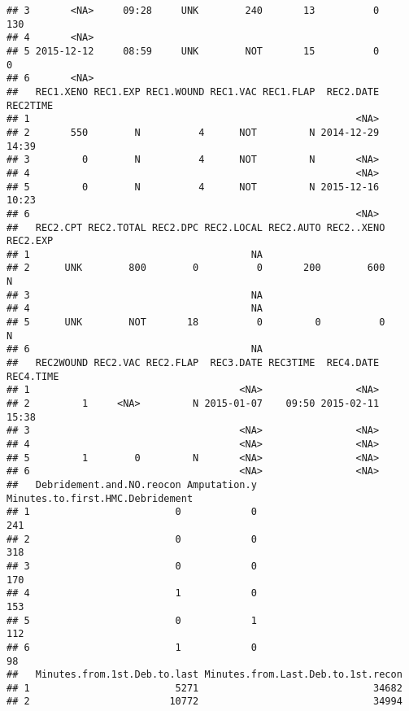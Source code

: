 \documentclass[]{article}
\begin{document}
\begin{verbatim}
## 3       <NA>     09:28     UNK        240       13          0       130
## 4       <NA>                                                           
## 5 2015-12-12     08:59     UNK        NOT       15          0         0
## 6       <NA>                                                           
##   REC1.XENO REC1.EXP REC1.WOUND REC1.VAC REC1.FLAP  REC2.DATE REC2TIME
## 1                                                        <NA>         
## 2       550        N          4      NOT         N 2014-12-29    14:39
## 3         0        N          4      NOT         N       <NA>         
## 4                                                        <NA>         
## 5         0        N          4      NOT         N 2015-12-16    10:23
## 6                                                        <NA>         
##   REC2.CPT REC2.TOTAL REC2.DPC REC2.LOCAL REC2.AUTO REC2..XENO REC2.EXP
## 1                                      NA                              
## 2      UNK        800        0          0       200        600        N
## 3                                      NA                              
## 4                                      NA                              
## 5      UNK        NOT       18          0         0          0        N
## 6                                      NA                              
##   REC2WOUND REC2.VAC REC2.FLAP  REC3.DATE REC3TIME  REC4.DATE REC4.TIME
## 1                                    <NA>                <NA>          
## 2         1     <NA>         N 2015-01-07    09:50 2015-02-11     15:38
## 3                                    <NA>                <NA>          
## 4                                    <NA>                <NA>          
## 5         1        0         N       <NA>                <NA>          
## 6                                    <NA>                <NA>          
##   Debridement.and.NO.reocon Amputation.y Minutes.to.first.HMC.Debridement
## 1                         0            0                              241
## 2                         0            0                              318
## 3                         0            0                              170
## 4                         1            0                              153
## 5                         0            1                              112
## 6                         1            0                               98
##   Minutes.from.1st.Deb.to.last Minutes.from.Last.Deb.to.1st.recon
## 1                         5271                              34682
## 2                        10772                              34994

\end{verbatim}
\end{document}
